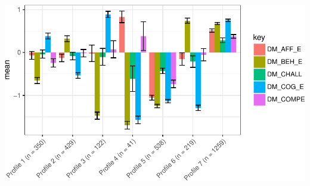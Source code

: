\documentclass[]{book}
\theoremstyle{definition}
\theoremstyle{definition}
\theoremstyle{definition}
\theoremstyle{remark}
\begin{document}
\begin{center}\includegraphics[width=0.8\linewidth]{rosenberg-dissertation_files/figure-latex/spec-solutions-model2-7-1} \end{center}
\end{document}
